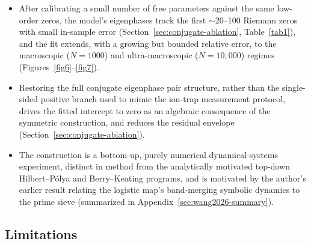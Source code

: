 \documentclass[mca,article,submit,oneauthor,pdftex]{Definitions/mdpi}
\begin{document}
\begin{itemize}
\item After calibrating a small number of free parameters against the same
  low-order zeros, the model's eigenphases track the first $\sim$20--100
  Riemann zeros with small in-sample error (Section~\ref{sec:conjugate-ablation},
  Table~\ref{tab1}), and the fit extends, with a growing but bounded relative
  error, to the macroscopic ($N=1000$) and ultra-macroscopic ($N=10{,}000$)
  regimes (Figures~\ref{fig6}--\ref{fig7}).
\item Restoring the full conjugate eigenphase pair structure, rather than the
  single-sided positive branch used to mimic the ion-trap measurement
  protocol, drives the fitted intercept to zero as an algebraic consequence of
  the symmetric construction, and reduces the residual envelope
  (Section~\ref{sec:conjugate-ablation}).
\item The construction is a bottom-up, purely numerical dynamical-systems
  experiment, distinct in method from the analytically motivated top-down
  Hilbert--P\'olya and Berry--Keating programs, and is motivated by the
  author's earlier result relating the logistic map's band-merging symbolic
  dynamics to the prime sieve \cite{wang2026} (summarized in
  Appendix~\ref{sec:wang2026-summary}).
\end{itemize}

\subsection{Limitations}
\end{document}
